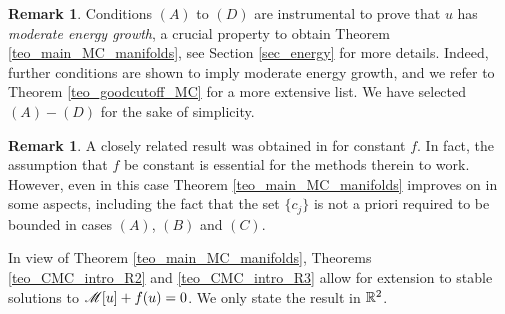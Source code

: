 \documentclass[10 pt,a4paper]{article}
\theoremstyle{definition}
\newtheorem{remark}[definition]{Remark}
\begin{document}
\begin{remark}
	Conditions $(A)$ to $(D)$ are instrumental to prove that $u$ has \emph{moderate energy growth}, a crucial property to obtain Theorem \ref{teo_main_MC_manifolds}, see Section \ref{sec_energy} for more details. Indeed, further conditions are shown to imply moderate energy growth, and we refer to Theorem \ref{teo_goodcutoff_MC} for a more extensive list. We have  selected $(A)-(D)$ for the sake of simplicity. 	
\end{remark}

\begin{remark}
	A closely related result was obtained in \cite[Theorem 1.6]{cmr} for constant $f$. In fact, the assumption that $f$ be constant is essential for the methods therein to work. However, even in this case Theorem \ref{teo_main_MC_manifolds} improves on \cite{cmr} in some aspects, including the fact that the set $\{c_j\}$ is not a priori required to be bounded in cases $(A)$, $(B)$ and $(C)$.
\end{remark}

In view of Theorem \ref{teo_main_MC_manifolds}, Theorems \ref{teo_CMC_intro_R2} and \ref{teo_CMC_intro_R3} allow for extension to  stable solutions to $\mathscr{M}[u] + f(u) = 0$. We only state the result in $\mathbb R^2$.
\end{document}
